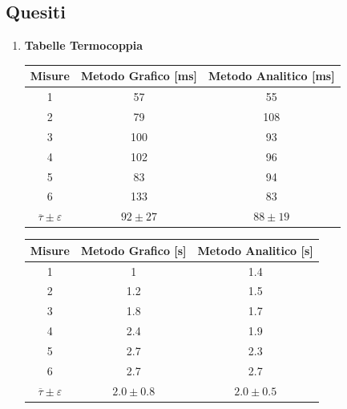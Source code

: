 \documentclass[a4paper, 12pt, twoside]{report}
\newcommand{\ra}[1]{\renewcommand{\arraystretch}{#1}} %
\begin{document}
		\subsection{Quesiti}
		\begin{enumerate}
			\item \textbf{Tabelle Termocoppia} 
			
			\begin{table}[H]
				\centering
				\ra{1.3}
				 \label{tab:title} 				
					\begin{tabular}{ccc}
						\toprule
						 \textbf{Misure}                &  \textbf{Metodo Grafico} [ms] &  \textbf{Metodo Analitico} [ms] \\ \midrule
						1                               & 57                   & 55                     \\ 
						2                               & 79                   & 108                    \\ 
						3                               & 100                  & 93                     \\ 
						4                               & 102                  & 96                     \\ 
						5                               & 83                   & 94                     \\ 
						6                               & 133                  & 83                     \\ 
						$\overline{\tau}\pm\varepsilon$ &  $92\pm27$           &  $ 88\pm19 $             \\  \bottomrule
					\end{tabular}			
			\end{table}
			
			\begin{table}[H]
				\centering
				\ra{1.3}
				\label{tab:title1} 				
					\begin{tabular}{ccc}
						\toprule
						 \textbf{Misure}                         & \textbf{Metodo Grafic}o [s] &  \textbf{Metodo Analitico} [s] \\ \midrule
						1                               & 1                   & 1.4                   \\ 
						2                               & 1.2                 & 1.5                   \\ 
						3                               & 1.8                 & 1.7                   \\ 
						4                               & 2.4                 & 1.9                   \\ 
						5                               & 2.7                 & 2.3                   \\ 
						6                               & 2.7                 & 2.7                   \\ 
						$\overline{\tau}\pm\varepsilon$ & $ 2.0\pm0.8   $     & $ 2.0\pm0.5  $        \\ \bottomrule
					\end{tabular}
				

\end{table}
\end{enumerate}
\end{document}
